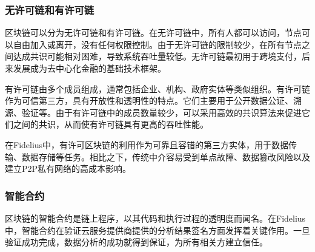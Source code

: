 \subsubsection{无许可链和有许可链}
区块链可以分为无许可链和有许可链。在无许可链中，所有人都可以访问，节点可以自由加入或离开，没有任何权限控制。由于无许可链的限制较少，在所有节点之间达成共识可能相对困难，导致系统吞吐量较低。无许可链最初用于跨境支付，后来发展成为去中心化金融的基础技术框架。

有许可链由多个成员组成，通常包括企业、机构、政府实体等类似组织。有许可链作为可信第三方，具有开放性和透明性的特点。它们主要用于公开数据公证、溯源、验证等。由于有许可链中的成员数量较少，可以采用高效的共识算法来促进它们之间的共识，从而使有许可链具有更高的吞吐性能。

在Fidelius中，有许可区块链的利用作为可靠且容错的第三方实体，用于数据传输、数据存储等任务。相比之下，传统中介容易受到单点故障、数据篡改风险以及建立P2P私有网络的高成本影响。

\subsubsection{智能合约}
区块链的智能合约是链上程序，以其代码和执行过程的透明度而闻名。在Fidelius中，智能合约在验证云服务提供商提供的分析结果签名方面发挥着关键作用。一旦验证成功完成，数据分析的成功就得到保证，为所有相关方建立信任。 